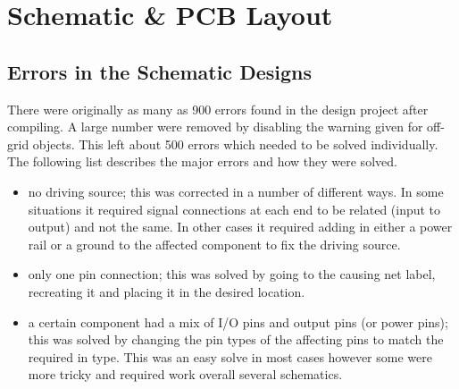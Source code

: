 
\chapter{Schematic \& PCB Layout} %

\label{Chapter6} %

\AddToShipoutPicture*{\SchematicLayout}

\begin{parcolumns}[colwidths={1=.6\textwidth},rulebetween=false]{2}
\colchunk{%
}
\end{parcolumns}
\newpage


\section{Errors in the Schematic Designs}
\label{chap6sec1}

There were originally as many as 900 errors found in the design project after compiling. A large number were removed by disabling the warning given for off-grid objects. This left about 500 errors which needed to be solved individually. The following list describes the major errors and how they were solved.

\begin{itemize}
\item no driving source; this was corrected in a number of different ways. In some situations it required signal connections at each end to be related (input to output) and not the same. In other cases it required adding in either a power rail or a ground to the affected component to fix the driving source. 
\item only one pin connection; this was solved by going to the causing net label, recreating it and placing it in the desired location. 
\item a certain component had a mix of I/O pins and output pins (or power pins); this was solved by changing the pin types of the affecting pins to match the required in type. This was an easy solve in most cases however some were more tricky and required work overall several schematics. 
\end{itemize}

